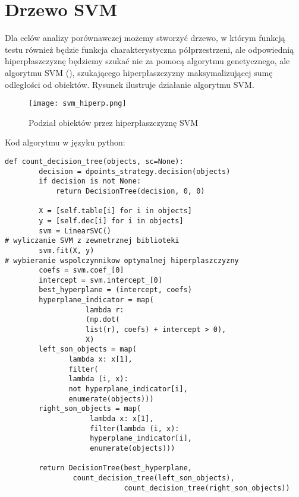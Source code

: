 \documentclass[magisterska]{pracamgr}
\theoremstyle{plain}
\theoremstyle{definition}
\theoremstyle{remark}
\begin{document}
\section{Drzewo SVM}
Dla celów analizy porównawczej możemy stworzyć drzewo, w którym funkcją testu
również będzie funkcja charakterystyczna półprzestrzeni, ale odpowiednią hiperpłaszczyznę
będziemy szukać nie za pomocą algorytmu genetycznego, ale algorytmu SVM (\cite{SVM}), szukającego 
hiperpłaszczyzny maksymalizującej sumę odległości od obiektów. Rysunek ilustruje działanie
algorytmu SVM.
\begin{figure}
 \caption{Podział obiektów przez hiperpłaszczyznę SVM}
 \texttt{[image: svm\_hiperp.png]}
\end{figure}
Kod algorytmu w języku python:
\begin{lstlisting}
def count_decision_tree(objects, sc=None):
        decision = dpoints_strategy.decision(objects)
        if decision is not None:
            return DecisionTree(decision, 0, 0)

        X = [self.table[i] for i in objects]
        y = [self.dec[i] for i in objects]
        svm = LinearSVC()
# wyliczanie SVM z zewnetrznej biblioteki
        svm.fit(X, y)
# wybieranie wspolczynnikow optymalnej hiperplaszczyzny
        coefs = svm.coef_[0]
        intercept = svm.intercept_[0]
        best_hyperplane = (intercept, coefs)
        hyperplane_indicator = map(
			       lambda r: 
			       (np.dot(
			       list(r), coefs) + intercept > 0),
			       X)
        left_son_objects = map(
			   lambda x: x[1], 
			   filter(
			   lambda (i, x): 
			   not hyperplane_indicator[i], 
			   enumerate(objects)))
        right_son_objects = map(
		            lambda x: x[1], 
		            filter(lambda (i, x): 
		            hyperplane_indicator[i], 
		            enumerate(objects)))

        return DecisionTree(best_hyperplane, 
			    count_decision_tree(left_son_objects),
                            count_decision_tree(right_son_objects))
\end{lstlisting}
\end{document}
